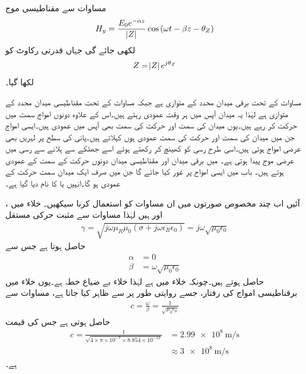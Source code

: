 مساوات  سے مقناطیسی موج
\begin{align}\label{مساوات_موج_عمومی_مقناطیسی}
H_y=\frac{E_0 e^{-\alpha z}}{\abs{Z}} \cos \left(\omega t - \beta z -\theta_{Z} \right)
\end{align}
لکھی جائے گی جہاں قدرتی رکاوٹ کو
\begin{align}
Z=\abs{Z} e^{j \theta_{Z}}
\end{align}
لکھا گیا۔

مساوات  کے تحت برقی میدان  محدد کے متوازی ہے جبکہ مساوات  کے تحت مقناطیسی میدان  محدد کے متوازی ہے لہٰذا یہ میدان  آپس میں ہر وقت عمودی رہتے ہیں۔اس کے علاوہ دونوں امواج  سمت میں حرکت کر رہے ہیں۔یوں میدان کی سمت اور حرکت کی سمت بھی آپس میں عمودی ہیں۔ایسی امواج جن میں میدان کی سمت اور حرکت کی سمت عمودی ہوں  کہلاتے ہیں۔پانی کی سطح پر لہریں بھی عرضی امواج ہوتی ہیں۔اسی طرح رسی کو کھینچ کر رکھتے ہوئے اسے جھٹکے  سے ہلانے سے  رسی میں عرضی موج پیدا ہوتی ہے۔ میں برقی میدان اور مقناطیسی میدان دونوں حرکت کے سمت کے عمودی ہوتے ہیں۔ باب  میں ایسی امواج پر غور کیا جائے گا جن میں صرف ایک میدان سمت حرکت کے عمودی ہو گا۔انہیں  یا  کا نام دیا گیا ہے۔ 

آئیں اب چند مخصوص صورتوں میں ان مساوات کو استعمال کرنا سیکھیں۔
خلاء میں ،  اور   ہیں لہٰذا مساوات  سے مثبت حرکی مستقل
\begin{align*}
\gamma=\sqrt{j \omega \mu_R \mu_0  \left(\sigma +j \omega \epsilon_R \epsilon_0 \right)}=j \omega \sqrt{\mu_0 \epsilon_0}
\end{align*}
حاصل ہوتا ہے جس سے
\begin{align*}
\alpha&=0\\
\beta&=\omega \sqrt{\mu_0 \epsilon_0}
\end{align*}
حاصل ہوتے ہیں۔چونکہ خلاء میں   ہے لہٰذا خلاء بے ضیاع خطہ ہے۔یوں خلاء میں برقناطیسی امواج کی رفتار، جسے روایتی طور پر  سے ظاہر کیا جاتا ہے،  مساوات  سے
\begin{align}
c=\frac{\omega}{\beta}=\frac{1}{\sqrt{\mu_0 \epsilon_0}}
\end{align}
حاصل ہوتی ہے جس کی قیمت
\begin{align*}
c=\frac{1}{\sqrt{4 \times \pi \times 10^{-7} \times 8.854 \times 10^{-12}}}&=\SI{2.99e8}{\meter \per \second} \\
&\approx \SI{3e8}{\meter \per \second}
\end{align*}
ہے۔

